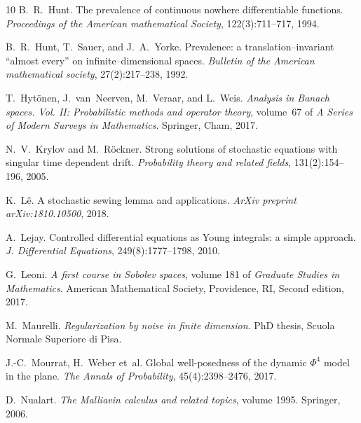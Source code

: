 \documentclass[10pt]{article}
\newcommand{\tmtextit}[1]{{\itshape{#1}}}
\begin{document}
\begin{thebibliography}{10}
  B.~R.~Hunt. {\newblock}The prevalence of continuous
  nowhere differentiable functions. {\newblock}\tmtextit{Proceedings of the
  American mathematical Society}, 122(3):711--717, 1994.{\newblock}
  
  B.~R.~Hunt, T.~Sauer, and  J.~A.~Yorke.
  {\newblock}Prevalence: a translation--invariant ``almost every'' on
  infinite--dimensional spaces. {\newblock}\tmtextit{Bulletin of the American
  mathematical society}, 27(2):217--238, 1992.{\newblock}
  
  T.~Hyt{\"o}nen, J.~van~Neerven, M.~Veraar, and 
  L.~Weis. {\newblock}\tmtextit{Analysis in Banach spaces. Vol. II:
  Probabilistic methods and operator theory},  volume~67  of \tmtextit{A
  Series of Modern Surveys in Mathematics}. {\newblock}Springer, Cham,
  2017.{\newblock}
  
  N.~V.~Krylov  and  M.~R{\"o}ckner. {\newblock}Strong
  solutions of stochastic equations with singular time dependent drift.
  {\newblock}\tmtextit{Probability theory and related fields},
  131(2):154--196, 2005.{\newblock}
  
  K.~L{\^e}. {\newblock}A stochastic sewing lemma and
  applications. {\newblock}\tmtextit{ArXiv preprint arXiv:1810.10500},
  2018.{\newblock}
  
  A.~Lejay. {\newblock}Controlled differential equations as
  Young integrals: a simple approach. {\newblock}\tmtextit{J. Differential
  Equations}, 249(8):1777--1798, 2010.{\newblock}
  
  G.~Leoni. {\newblock}\tmtextit{A first course in Sobolev
  spaces},  volume  181  of \tmtextit{Graduate Studies in Mathematics}.
  {\newblock}American Mathematical Society, Providence, RI, Second  edition,
  2017.{\newblock}
  
  M.~Maurelli. {\newblock}\tmtextit{Regularization by
  noise in finite dimension}. {\newblock}PhD thesis, Scuola Normale Superiore
  di Pisa.{\newblock}
  
  J.-C.~Mourrat, H.~Weber et~al. {\newblock}Global
  well-posedness of the dynamic $\Phi^4$ model in the plane.
  {\newblock}\tmtextit{The Annals of Probability}, 45(4):2398--2476,
  2017.{\newblock}
  
  D.~Nualart. {\newblock}\tmtextit{The Malliavin
  calculus and related topics},  volume  1995. {\newblock}Springer,
  2006.{\newblock}
  

\end{thebibliography}
\end{document}
